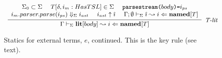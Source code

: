 \begin{figure}
\centering
\[
\footnotesize
\begin{array}{c}
\infer[\textit{T-lit}]
	  {\Gamma \vdash_\Sigma \keyw{lit}[body] \leadsto i \Leftarrow \keyw{named}[T]}
	  {\begin{array}{c}
	   \Sigma_0 \subset \Sigma ~~~~
	   T[\delta, i_m : HasTSL] \in \Sigma ~~~~
	   \texttt{parsestream(}body\texttt{)=}i_{ps} \\
	   i_m.parser.parse(i_{ps}) \Downarrow_\Sigma i_{ast}~~~~
	   i_{ast} \uparrow \ih~~~~
	   \Gamma; \emptyset \vdash_\Sigma \ih \leadsto i \Leftarrow \keyw{named}[T]
	   \end{array}}
\end{array}
\]
\caption{Statics for external terms, $e$, continued. This is the key rule (see text).}
\label{fig:statics-lit}
\end{figure}
\newcommand{\Gout}{\Gamma_{\text{o}}}
\newcommand{\Gin}{\Gamma}
